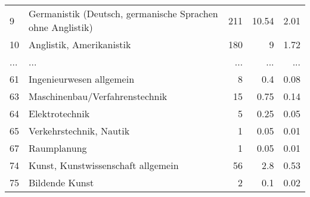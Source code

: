 \begin{longtable}{lXrrr}
        9 & \multicolumn{1}{X}{Germanistik (Deutsch, germanische Sprachen ohne Anglistik)} & %
          \num{211} &
          \num[round-mode=places,round-precision=2]{10,54} &
          \num[round-mode=places,round-precision=2]{2,01} \\
        10 & \multicolumn{1}{X}{Anglistik, Amerikanistik} & %
          \num{180} &
          \num[round-mode=places,round-precision=2]{9} &
          \num[round-mode=places,round-precision=2]{1,72} \\
       ... & ... & ... & ... & ... \\
        61 & \multicolumn{1}{X}{Ingenieurwesen allgemein} & %
          \num{8} &
          \num[round-mode=places,round-precision=2]{0,4} &
          \num[round-mode=places,round-precision=2]{0,08} \\

        63 & \multicolumn{1}{X}{Maschinenbau/Verfahrenstechnik} & %
          \num{15} &
          \num[round-mode=places,round-precision=2]{0,75} &
          \num[round-mode=places,round-precision=2]{0,14} \\

        64 & \multicolumn{1}{X}{Elektrotechnik} & %
          \num{5} &
          \num[round-mode=places,round-precision=2]{0,25} &
          \num[round-mode=places,round-precision=2]{0,05} \\

        65 & \multicolumn{1}{X}{Verkehrstechnik, Nautik} & %
          \num{1} &
          \num[round-mode=places,round-precision=2]{0,05} &
          \num[round-mode=places,round-precision=2]{0,01} \\

        67 & \multicolumn{1}{X}{Raumplanung} & %
          \num{1} &
          \num[round-mode=places,round-precision=2]{0,05} &
          \num[round-mode=places,round-precision=2]{0,01} \\

        74 & \multicolumn{1}{X}{Kunst, Kunstwissenschaft allgemein} & %
          \num{56} &
          \num[round-mode=places,round-precision=2]{2,8} &
          \num[round-mode=places,round-precision=2]{0,53} \\

        75 & \multicolumn{1}{X}{Bildende Kunst} & %
          \num{2} &
          \num[round-mode=places,round-precision=2]{0,1} &
          \num[round-mode=places,round-precision=2]{0,02} \\


\end{longtable}
